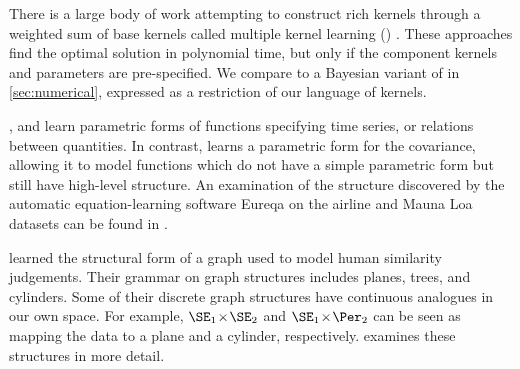 There is a large body of work attempting to construct rich kernels through a weighted sum of base kernels called multiple kernel learning (\MKL{}) \citep[e.g.][]{bach2004multiple}.
These approaches find the optimal solution in polynomial time, but only if the component kernels and parameters are pre-specified.
We compare to a Bayesian variant of \MKL{} in \cref{sec:numerical}, expressed as a restriction of our language of kernels.


\cite{todorovski1997declarative}, \cite{washio1999discovering} and \cite{Schmidt2009b} learn parametric forms of functions specifying time series, or relations between quantities.
In contrast, \procedurename{} learns a parametric form for the covariance, allowing it to model functions which do not have a simple parametric form but still have high-level structure.
An examination of the structure discovered by the automatic equation-learning software Eureqa \citep{Eureqa} on the airline and Mauna Loa datasets can be found in \citet{LloDuvGroetal14}.





\citet{kemp2008discovery} learned the structural form of a graph used to model human similarity judgements.
Their grammar on graph structures includes planes, trees, and cylinders.
Some of their discrete graph structures have continuous analogues in our own space.
For example, $\SE_1 \kerntimes \SE_2$ and $\SE_1 \kerntimes \Per_2$ can be seen as mapping the data to a plane and a cylinder, respectively.
 examines these structures in more detail.

